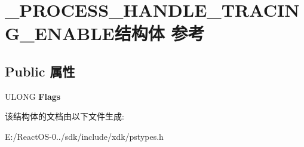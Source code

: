 \hypertarget{struct___p_r_o_c_e_s_s___h_a_n_d_l_e___t_r_a_c_i_n_g___e_n_a_b_l_e}{}\section{\+\_\+\+P\+R\+O\+C\+E\+S\+S\+\_\+\+H\+A\+N\+D\+L\+E\+\_\+\+T\+R\+A\+C\+I\+N\+G\+\_\+\+E\+N\+A\+B\+L\+E结构体 参考}
\label{struct___p_r_o_c_e_s_s___h_a_n_d_l_e___t_r_a_c_i_n_g___e_n_a_b_l_e}
\subsection*{Public 属性}
\begin{DoxyCompactItemize}
\item 
\mbox{\label{struct___p_r_o_c_e_s_s___h_a_n_d_l_e___t_r_a_c_i_n_g___e_n_a_b_l_e_af5388090e1919b0e2dcc5849c853b9b3}} 
U\+L\+O\+NG {\bfseries Flags}
\end{DoxyCompactItemize}


该结构体的文档由以下文件生成\+:\begin{DoxyCompactItemize}
\item 
E\+:/\+React\+O\+S-\/0../sdk/include/xdk/pstypes.\+h\end{DoxyCompactItemize}
